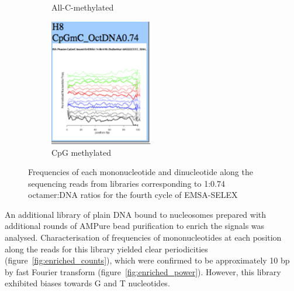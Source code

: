 \documentclass[parskip=full, numbers=noenddot]{scrreprt}
\begin{document}
\begin{figure}[htpb]
\begin{subfigure}[htpb]{0.5\textwidth}
    \caption{All-C-methylated}
    \label{fig:freqplots_g8}
  \end{subfigure}
  \begin{subfigure}[htpb]{0.5\textwidth}
    \centering
    \includegraphics[width=0.5\textwidth]{emsa_h8_counts}
    \caption{CpG methylated}
    \label{fig:freqplots_h8}
  \end{subfigure}
  \caption{Frequencies of each mononucleotide and dinucleotide along the sequencing reads from libraries corresponding to 1:0.74 octamer:DNA ratios for the fourth cycle of EMSA-SELEX}
  \label{fig:freqplots}
\end{figure}

An additional library of plain DNA bound to nucleosomes prepared with additional rounds of AMPure bead purification to enrich the signals was analysed.  Characterisation of frequencies of mononucleotides at each position along the reads for this library yielded clear periodicities (figure~\ref{fig:enriched_counts}), which were confirmed to be approximately 10 bp by fast Fourier transform (figure~\ref{fig:enriched_power}).  However, this library exhibited biases towards G and T nucleotides.
\end{document}
